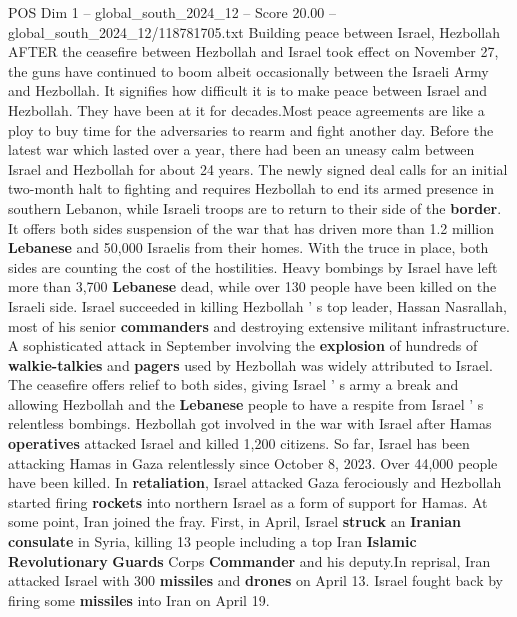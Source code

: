 \begin{textsample}{POS Dim 1 – global\_south\_2024\_12 – Score 20.00 – global\_south\_2024\_12/118781705.txt}  \label{ex:f1_pos_194}
Building peace between Israel, Hezbollah AFTER the ceasefire between Hezbollah and Israel took effect on November 27, the guns have continued to boom albeit occasionally between the Israeli Army and Hezbollah.
It signifies how difficult it is to make peace between Israel and Hezbollah.
They have been at it for decades.Most peace agreements are like a ploy to buy time for the adversaries to rearm and fight another day.
Before the latest war which lasted over a year, there had been an uneasy calm between Israel and Hezbollah for about 24 years.
The newly signed deal calls for an initial two-month halt to fighting and requires Hezbollah to end its armed presence in southern Lebanon, while Israeli troops are to return to their side of the \textbf{border}.
It offers both sides suspension of the war that has driven more than 1.2 million \textbf{Lebanese} and 50,000 Israelis from their homes.
With the truce in place, both sides are counting the cost of the hostilities.
Heavy bombings by Israel have left more than 3,700 \textbf{Lebanese} dead, while over 130 people have been killed on the Israeli side.
Israel succeeded in killing Hezbollah ' s top leader, Hassan Nasrallah, most of his senior \textbf{commanders} and destroying extensive militant infrastructure.
A sophisticated attack in September involving the \textbf{explosion} of hundreds of \textbf{walkie-talkies} and \textbf{pagers} used by Hezbollah was widely attributed to Israel.
The ceasefire offers relief to both sides, giving Israel ' s army a break and allowing Hezbollah and the \textbf{Lebanese} people to have a respite from Israel ' s relentless bombings.
Hezbollah got involved in the war with Israel after Hamas \textbf{operatives} attacked Israel and killed 1,200 citizens.
So far, Israel has been attacking Hamas in Gaza relentlessly since October 8, 2023.
Over 44,000 people have been killed.
In \textbf{retaliation}, Israel attacked Gaza ferociously and Hezbollah started firing \textbf{rockets} into northern Israel as a form of support for Hamas.
At some point, Iran joined the fray.
First, in April, Israel \textbf{struck} an \textbf{Iranian} \textbf{consulate} in Syria, killing 13 people including a top Iran \textbf{Islamic} \textbf{Revolutionary} \textbf{Guards} Corps \textbf{Commander} and his deputy.In reprisal, Iran attacked Israel with 300 \textbf{missiles} and \textbf{drones} on April 13.
Israel fought back by firing some \textbf{missiles} into Iran on April 19.

\end{textsample}
